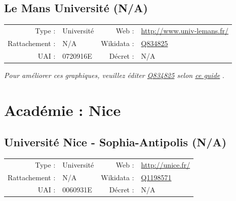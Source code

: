 \documentclass[12pt,french,landscape]{article}
\begin{document}

\newpage

\hypertarget{le-mans-universituxe9-na}{%
\subsection{Le Mans Université (N/A)}\label{le-mans-universituxe9-na}}

\begin{tabular*}{0.45\textwidth}{rp{2cm}rl}  
\hline  
Type : & Université & Web : &\href{http://www.univ-lemans.fr/}{http://www.univ-lemans.fr/} \\  
Rattachement : & N/A & Wikidata : & \href{https://www.wikidata.org/entity/Q834825}{Q834825} \\  
UAI : & 0720916E & Décret : & N/A \\  
\hline  
\end{tabular*}

\textit{\scriptsize Pour améliorer ces graphiques, veuillez éditer \href{https://www.wikidata.org/entity/Q834825}{Q834825}  selon \href{https://github.com/cpesr/wikidataESR/blob/master/Rmd/wikidataESR.md}{ce guide}}
.


\newpage

\hypertarget{acaduxe9mie-nice}{%
\section{Académie : Nice}\label{acaduxe9mie-nice}}

\hypertarget{universituxe9-nice---sophia-antipolis-na}{%
\subsection{Université Nice - Sophia-Antipolis
(N/A)}\label{universituxe9-nice---sophia-antipolis-na}}

\begin{tabular*}{0.45\textwidth}{rp{2cm}rl}  
\hline  
Type : & Université & Web : &\href{http://unice.fr/}{http://unice.fr/} \\  
Rattachement : & N/A & Wikidata : & \href{https://www.wikidata.org/entity/Q1198571}{Q1198571} \\  
UAI : & 0060931E & Décret : & N/A \\  
\hline  
\end{tabular*}
\end{document}
